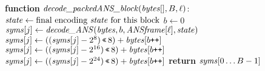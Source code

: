 \begin{algorithmic}[1]
\State
  {\bf{function}} $\mbox{\emph{decode\_packedANS\_block}}(\mbox{\emph{bytes}}[], B, \ell)$:
\State $\mbox{\emph{state}} \leftarrow \mbox{final encoding \mbox{\emph{state}} for this block}$
\State
  $b \leftarrow 0$
  \State
    $\mbox{\emph{syms}}[j] \leftarrow
	\mbox{\emph{decode\_ANS}}(\mbox{\emph{bytes}}, b, \mbox{\emph{ANSframe}}[\ell], \mbox{\emph{state}})$
\EndFor
{}
  \EndIf
  \State $\mbox{\emph{syms}}[j]
	\leftarrow ((\mbox{\emph{syms}}[j]-2^8) {\mbox{\,\tt{<<}}\,} 8)
	+ \mbox{\emph{bytes}}[b{\mbox{\tt{++}}}]$
  \EndIf
  \State $\mbox{\emph{syms}}[j]
	\leftarrow ((\mbox{\emph{syms}}[j]-2^{16}) {\mbox{\,\tt{<<}}\,} 8)
	+ \mbox{\emph{bytes}}[b{\mbox{\tt{++}}}]$
  \EndIf
  \State $\mbox{\emph{syms}}[j]
	\leftarrow ((\mbox{\emph{syms}}[j]-2^{24}) {\mbox{\,\tt{<<}}\,} 8)
	+ \mbox{\emph{bytes}}[b{\mbox{\tt{++}}}]$
\EndFor
\State
  {\bf return} $\mbox{\emph{syms}}[0\ldots B-1]$
\end{algorithmic}
